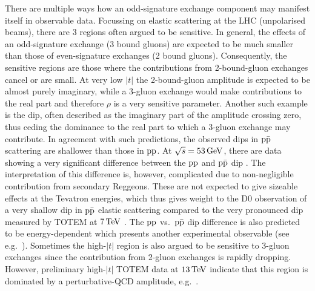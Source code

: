 There are multiple ways how an odd-signature exchange component may manifest itself in observable data. Focussing on elastic scattering at the LHC (unpolarised beams), there are 3 regions often argued to be sensitive. In general, the effects of an odd-signature exchange (3 bound gluons) are expected to be much smaller than those of even-signature exchanges (2 bound gluons). Consequently, the sensitive regions are those where the contributions from 2-bound-gluon exchanges cancel or are small. At very low $|t|$ the 2-bound-gluon amplitude is expected to be almost purely imaginary, while a 3-gluon exchange would make contributions to the real part and therefore $\rho$ is a very sensitive parameter. Another such example is the dip, often described as the imaginary part of the amplitude crossing zero, thus ceding the dominance to the real part to which a 3-gluon exchange may contribute. In agreement with such predictions, the observed dips in $\rm p\bar p$ scattering are shallower than those in $\rm pp$. At $\sqrt s = 53\,{\rm GeV}$, there are data showing a very significant difference between the $\rm pp$ and $\rm p\bar p$ dip \cite{breakstone-85}. The interpretation of this difference is, however, complicated due to non-negligible contribution from secondary Reggeons. These are not expected to give sizeable effects at the Tevatron energies, which thus gives weight to the D0 observation of a very shallow dip in $\rm p\bar p$ elastic scattering \cite{d0-elastic} compared to the very pronounced dip measured by TOTEM at $7\,{\rm TeV}$ \cite{totem-7tev-first}. The $\rm pp$ vs.~$\rm p\bar p$ dip difference is also predicted to be energy-dependent which presents another experimental observable (see e.g.~\cite{ster-2015}). Sometimes the high-$|t|$ region is also argued to be sensitive to 3-gluon exchanges since the contribution from 2-gluon exchanges is rapidly dropping. However, preliminary high-$|t|$ TOTEM data at $13\,{\rm TeV}$ indicate that this region is dominated by a perturbative-QCD amplitude, e.g.~\cite{Donnachie:1979yu}.

